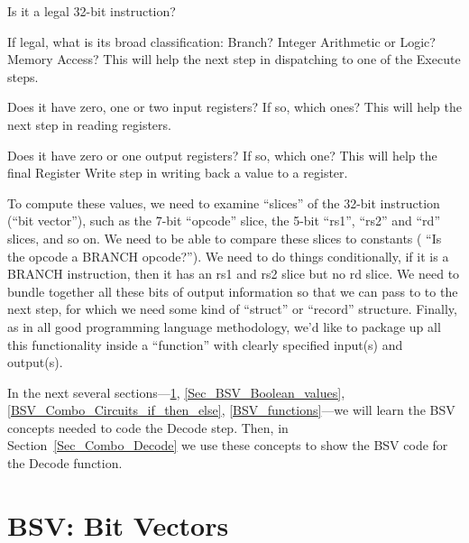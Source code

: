 \begin{tightlist}

 \item Is it a legal 32-bit instruction?

 \item If legal, what is its broad classification: Branch? Integer
   Arithmetic or Logic? Memory Access?  This will help the next step
   in dispatching to one of the Execute steps.

 \item Does it have zero, one or two input registers?  If so, which
   ones?  This will help the next step in reading registers.

 \item Does it have zero or one output registers?  If so, which one?
   This will help the final Register Write step in writing back a
   value to a register.

\end{tightlist}

To compute these values, we need to examine ``slices'' of the 32-bit
instruction (``bit vector''), such as the 7-bit ``opcode'' slice, the
5-bit ``rs1'', ``rs2'' and ``rd'' slices, and so on.  We need to be
able to compare these slices to constants ({\eg} ``Is the opcode a
BRANCH opcode?'').  We need to do things conditionally, {\eg} if it is
a BRANCH instruction, then it has an rs1 and rs2 slice but no rd
slice.  We need to bundle together all these bits of output
information so that we can pass to to the next step, for which we need
some kind of ``struct'' or ``record'' structure.  Finally, as in all
good programming language methodology, we'd like to package up all
this functionality inside a ``function'' with clearly specified
input(s) and output(s).

In the next several sections---\ref{Sec_BSV_Bit_Vectors},
\ref{Sec_BSV_Boolean_values}, \ref{BSV_Combo_Circuits_if_then_else},
\ref{BSV_functions}---we will learn the BSV concepts needed to code
the Decode step.  Then, in Section~\ref{Sec_Combo_Decode} we use these
concepts to show the BSV code for the Decode function.


\section{BSV: Bit Vectors}

\label{Sec_BSV_Bit_Vectors}

